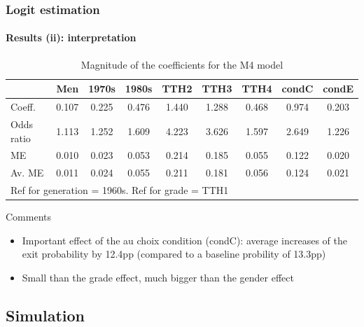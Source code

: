 \documentclass[xcolor=table,ignorenonframetext,12pt]{beamer}
\newenvironment{choixmarges}[2]{\begin{list}{}{%
\setlength{\topsep}{0pt}%
\setlength{\leftmargin}{0pt}%
\setlength{\rightmargin}{0pt}%
\setlength{\listparindent}{\parindent}%
\setlength{\itemindent}{\parindent}%
\setlength{\parsep}{0pt plus 1pt}%
\addtolength{\leftmargin}{#1}%
\addtolength{\rightmargin}{#2}%
}\item }{\end{list}}
\begin{document}
\begin{frame}
\frametitle{Logit estimation}
\framesubtitle{Results (ii): interpretation}


\vspace{-0.2cm}

\begin{choixmarges}{-0.7cm}{-0.7cm}

\begin{table}
\centering
\begingroup\footnotesize
\caption{Magnitude of the coefficients for the M4 model}
\vspace{-0.3cm}
\begin{tabular}{lcccccccc}
  \hline
 & Men & 1970s & 1980s & TTH2 & TTH3 & TTH4 & condC & condE \\ 
  \hline
Coeff. & 0.107 & 0.225 & 0.476 & 1.440 & 1.288 & 0.468 & 0.974 & 0.203 \\ 
Odds ratio & 1.113 & 1.252 & 1.609 & 4.223 & 3.626 & 1.597 & 2.649 & 1.226 \\ 
ME & 0.010 & 0.023 & 0.053 & 0.214 & 0.185 & 0.055 & 0.122 & 0.020 \\ 
  Av. ME & 0.011 & 0.024 & 0.055 & 0.211 & 0.181 & 0.056 & 0.124 & 0.021 \\ 
   \hline
\multicolumn{9}{l}{\scriptsize{Ref for generation = 1960s. Ref for grade = TTH1}} \\
\end{tabular}
\endgroup
\end{table}
\end{choixmarges}

\vspace{0.2cm}

Comments
\begin{itemize}
\item  Important effect of the \og au choix \fg{} condition (condC): average increases of the exit probability by 12.4pp (compared to a baseline probility of 13.3pp)
\item  Small than the grade effect, much bigger than the gender effect 
\end{itemize}




\end{frame}

\subsection{Simulation}
\end{document}
